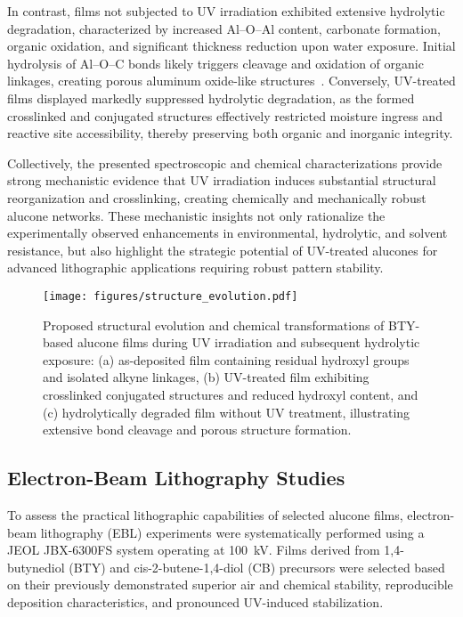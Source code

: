 In contrast, films not subjected to UV irradiation exhibited extensive hydrolytic degradation, characterized by increased Al--O--Al content, carbonate formation, organic oxidation, and significant thickness reduction upon water exposure. Initial hydrolysis of Al--O--C bonds likely triggers cleavage and oxidation of organic linkages, creating porous aluminum oxide-like structures~\cite{REF}. Conversely, UV-treated films displayed markedly suppressed hydrolytic degradation, as the formed crosslinked and conjugated structures effectively restricted moisture ingress and reactive site accessibility, thereby preserving both organic and inorganic integrity.

Collectively, the presented spectroscopic and chemical characterizations provide strong mechanistic evidence that UV irradiation induces substantial structural reorganization and crosslinking, creating chemically and mechanically robust alucone networks. These mechanistic insights not only rationalize the experimentally observed enhancements in environmental, hydrolytic, and solvent resistance, but also highlight the strategic potential of UV-treated alucones for advanced lithographic applications requiring robust pattern stability.

\begin{figure}[ht]
  \centering
  \texttt{[image: figures/structure\_evolution.pdf]}
  \caption{Proposed structural evolution and chemical transformations of BTY-based alucone films during UV irradiation and subsequent hydrolytic exposure: (a) as-deposited film containing residual hydroxyl groups and isolated alkyne linkages, (b) UV-treated film exhibiting crosslinked conjugated structures and reduced hydroxyl content, and (c) hydrolytically degraded film without UV treatment, illustrating extensive bond cleavage and porous structure formation.}
  \label{fig:structure_evolution}
\end{figure}



\subsection{Electron-Beam Lithography Studies}

To assess the practical lithographic capabilities of selected alucone films, electron-beam lithography (EBL) experiments were systematically performed using a JEOL JBX-6300FS system operating at \SI{100}{\kilo\volt}. Films derived from 1,4-butynediol (BTY) and cis-2-butene-1,4-diol (CB) precursors were selected based on their previously demonstrated superior air and chemical stability, reproducible deposition characteristics, and pronounced UV-induced stabilization.

